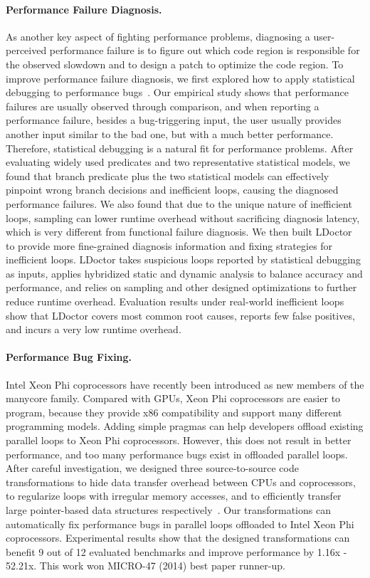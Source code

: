 \documentclass[10pt]{article}
\begin{document}
\paragraph{Performance Failure Diagnosis.}
As another key aspect of fighting performance problems,
diagnosing a user-perceived performance failure is to figure out which code 
region is responsible for the observed slowdown and 
to design a patch to optimize the code region.
To improve performance failure diagnosis, 
we first explored how to 
apply statistical debugging to performance bugs~\cite{Song14OOPSLA}. 
Our empirical study shows that performance failures are usually observed through comparison,
and when reporting a performance failure, besides a bug-triggering input, 
the user usually provides another input similar to the bad one, 
but with a much better performance.
Therefore, statistical debugging is a natural fit for performance problems. 
After evaluating widely used predicates and 
two representative statistical models, 
we found that branch predicate plus the two statistical models can effectively 
pinpoint wrong branch decisions and inefficient loops, 
causing the diagnosed performance failures. 
We also found that
due to the unique nature of inefficient loops, 
sampling can lower runtime overhead without sacrificing diagnosis latency, 
which is very different from functional failure diagnosis.
We then built LDoctor~\cite{Song17ICSE} to provide more 
fine-grained diagnosis information and fixing strategies for inefficient loops. 
LDoctor takes suspicious loops reported by 
statistical debugging as inputs, 
applies hybridized static and dynamic analysis to 
balance accuracy and performance, 
and relies on sampling and other designed optimizations 
to further reduce runtime overhead. 
Evaluation results under real-world inefficient loops 
show that LDoctor covers most common root causes, 
reports few false positives, and incurs a very low runtime overhead. 

\vspace{-.1in}
\paragraph{Performance Bug Fixing.}
Intel Xeon Phi coprocessors have recently been introduced 
as new members of the manycore family.
Compared with GPUs, Xeon Phi coprocessors are easier to program,
because they provide x86 compatibility and support many different programming models.
Adding simple pragmas can help developers offload existing parallel loops 
to Xeon Phi coprocessors. 
However, this does not result in better performance, 
and too many performance bugs exist in  
offloaded parallel loops. 
After careful investigation, we designed three source-to-source code transformations to 
hide data transfer overhead between CPUs and coprocessors, 
to regularize loops with irregular memory accesses, 
and to efficiently transfer large pointer-based data structures respectively~\cite{Song14MICRO}.
Our transformations can automatically fix performance bugs in parallel loops offloaded 
to Intel Xeon Phi coprocessors. 
Experimental results show that the designed transformations can benefit 9 
out of 12 evaluated benchmarks and improve performance by 1.16x - 52.21x. 
This work won MICRO-47 (2014) best paper runner-up.
\end{document}
